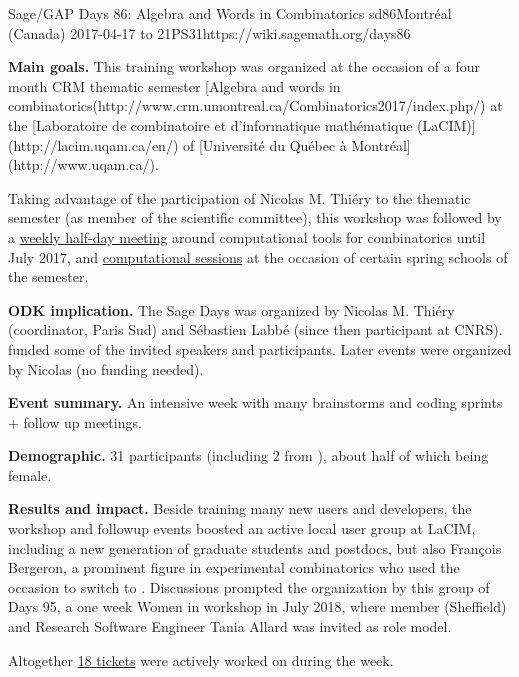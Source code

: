 \begin{event}{Sage/GAP Days 86: Algebra and Words in Combinatorics }{sd86}{Montréal (Canada) 2017-04-17 to 21}{PS}{31}{https://wiki.sagemath.org/days86}

  \textbf{Main goals.} This training workshop was organized at the
  occasion of a four month CRM thematic semester
  [Algebra and words in combinatorics(http://www.crm.umontreal.ca/Combinatorics2017/index.php/)
  at the [Laboratoire de combinatoire et d'informatique mathématique (LaCIM)](http://lacim.uqam.ca/en/) of
  [Université du Québec à Montréal](http://www.uqam.ca/).

  Taking advantage of the participation of Nicolas M. Thiéry to the
  thematic semester (as member of the scientific committee), this
  workshop was followed by a
  \href{https://wiki.sagemath.org/Montreal}{weekly half-day meeting}
  around computational tools for combinatorics until July 2017, and
  \href{https://more-sagemath-tutorials.readthedocs.io/en/latest/2017-05-29-CRM/}{computational
    sessions} at the occasion of certain spring schools of the
  semester.

  \textbf{ODK implication.} The Sage Days was organized by Nicolas M.
  Thiéry (\ODK coordinator, Paris Sud) and Sébastien Labbé (since then
  \ODK participant at CNRS). \ODK funded some of the invited speakers
  and \ODK participants. Later events were organized by Nicolas (no
  funding needed).

  \textbf{Event summary.} An intensive week with many brainstorms and
  coding sprints + follow up meetings.

  \textbf{Demographic.} 31 participants (including 2 from \ODK), about
  half of which being female.

  \textbf{Results and impact.} Beside training many new \Sage users
  and developers, the workshop and followup events boosted an active
  local user group at LaCIM, including a new generation of graduate
  students and postdocs, but also François Bergeron, a prominent
  figure in experimental combinatorics who used the occasion to switch
  to \Sage. Discussions prompted the organization by this group of
  \Sage Days 95, a one week Women in \Sage workshop in July 2018,
  where \ODK member (Sheffield) and Research Software Engineer Tania
  Allard was invited as role model.

  Altogether
  \href{https://trac.sagemath.org/query?status=closed&status=needs_info&status=needs_review&status=needs_work&status=new&status=positive_review&keywords=~days86&col=id&col=summary&col=status&col=time&col=changetime&col=author&col=reviewer&order=status}{18
    \Sage tickets} were actively worked on during the week.
\end{event}
